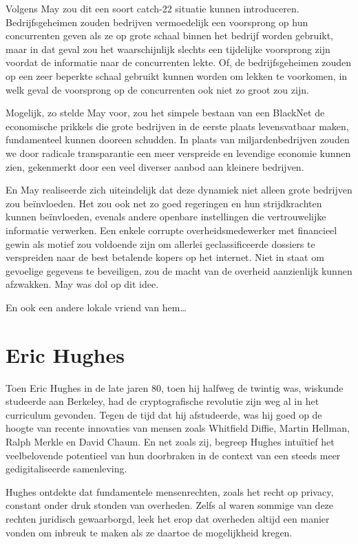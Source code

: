 \documentclass[
  a5paper,
  smalldemyvopaper,11pt,twoside,onecolumn,openright,extrafontsizes,
hidelinks]{memoir}
\begin{document}
Volgens May zou dit een soort catch-22 situatie kunnen introduceren.
Bedrijfsgeheimen zouden bedrijven vermoedelijk een voorsprong op hun
concurrenten geven als ze op grote schaal binnen het bedrijf worden
gebruikt, maar in dat geval zou het waarschijnlijk slechts een
tijdelijke voorsprong zijn voordat de informatie naar de concurrenten
lekte. Of, de bedrijfsgeheimen zouden op een zeer beperkte schaal
gebruikt kunnen worden om lekken te voorkomen, in welk geval de
voorsprong op de concurrenten ook niet zo groot zou zijn.

Mogelijk, zo stelde May voor, zou het simpele bestaan van een BlackNet
de economische prikkels die grote bedrijven in de eerste plaats
levensvatbaar maken, fundamenteel kunnen dooreen schudden. In plaats van
miljardenbedrijven zouden we door radicale transparantie een meer
verspreide en levendige economie kunnen zien, gekenmerkt door een veel
diverser aanbod aan kleinere bedrijven.

En May realiseerde zich uiteindelijk dat deze dynamiek niet alleen grote
bedrijven zou beïnvloeden. Het zou ook net zo goed regeringen en hun
strijdkrachten kunnen beïnvloeden, evenals andere openbare instellingen
die vertrouwelijke informatie verwerken. Een enkele corrupte
overheidsmedewerker met financieel gewin als motief zou voldoende zijn
om allerlei geclassificeerde dossiers te verspreiden naar de best
betalende kopers op het internet. Niet in staat om gevoelige gegevens te
beveiligen, zou de macht van de overheid aanzienlijk kunnen afzwakken.
May was dol op dit idee.

En ook een andere lokale vriend van hem\ldots{}

\section{Eric Hughes}\label{eric-hughes}

Toen Eric Hughes in de late jaren 80, toen hij halfweg de twintig was,
wiskunde studeerde aan Berkeley, had de cryptografische revolutie zijn
weg al in het curriculum gevonden. Tegen de tijd dat hij afstudeerde,
was hij goed op de hoogte van recente innovaties van mensen zoals
Whitfield Diffie, Martin Hellman, Ralph Merkle en David Chaum. En net
zoals zij, begreep Hughes intuïtief het veelbelovende potentieel van hun
doorbraken in de context van een steeds meer gedigitaliseerde
samenleving.

Hughes ontdekte dat fundamentele mensenrechten, zoals het recht op
privacy, constant onder druk stonden van overheden. Zelfs al waren
sommige van deze rechten juridisch gewaarborgd, leek het erop dat
overheden altijd een manier vonden om inbreuk te maken als ze daartoe de
mogelijkheid kregen.
\end{document}
